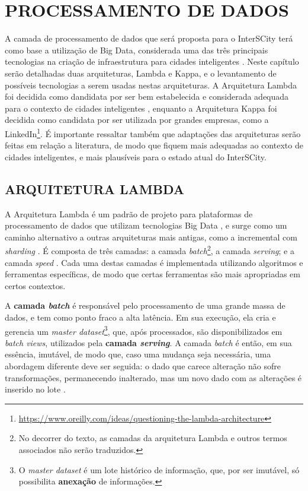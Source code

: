 \chapter[PROCESSAMENTO DE DADOS]{PROCESSAMENTO DE DADOS}
\label{chapter:data}

A camada de processamento de dados que será proposta para o InterSCity terá
como base a utilização de Big Data, considerada uma das três principais
tecnologias na criação de infraestrutura para cidades inteligentes
\cite{kon2016}. Neste capítulo serão detalhadas duas arquiteturas, Lambda e
Kappa, e o levantamento de possíveis tecnologias a serem usadas nestas
arquiteturas. A Arquitetura Lambda foi decidida como dandidata por ser bem
estabelecida e considerada adequada para o contexto de cidades inteligentes
\cite{kiran2015}, enquanto a Arquitetura Kappa foi decidida como candidata por
ser utilizada por grandes empresas, como a
LinkedIn\footnote{\url{https://www.oreilly.com/ideas/questioning-the-lambda-architecture}}.
É importante ressaltar também que adaptações das arquiteturas serão feitas em
relação a literatura, de modo que fiquem mais adequadas ao contexto de cidades
inteligentes, e mais plausíveis para o estado atual do InterSCity.

\section{ARQUITETURA LAMBDA}

A Arquitetura Lambda é um padrão de projeto para plataformas de processamento
de dados que utilizam tecnologias Big Data \cite{kiran2015}, e surge como um
caminho alternativo a outras arquiteturas mais antigas, como a incremental com
\textit{sharding} \cite{marz2015}. É composta de três camadas: a camada
\textit{batch}\footnote{No decorrer do texto, as camadas da arquitetura Lambda
e outros termos associados não serão traduzidos.}, a camada \textit{serving}; e
a camada \textit{speed} \cite{kiran2015}. Cada uma destas camadas é
implementada utilizando algoritmos e ferramentas específicas, de modo
que certas ferramentas são mais apropriadas em certos contextos.

A \textbf{camada \textit{batch}} é responsável pelo processamento de uma grande
massa de dados, e tem como ponto fraco a alta latência. Em sua execução, ela
cria e gerencia um \textit{master dataset}\footnote{O \textit{master dataset} é um lote
histórico de informação, que, por ser imutável, só possibilita \textbf{anexação}
de informações.}, que, após processados, são disponibilizados em
\textit{batch views}, utilizados pela \textbf{camada \textit{serving}}.
A camada \textit{batch} é então, em sua essência, imutável, de modo que, caso
uma mudança seja necessária, uma abordagem diferente deve ser seguida: o dado
que carece alteração não sofre transformações, permanecendo inalterado, mas um
novo dado com as alterações é inserido no lote \cite{marz2015}.


